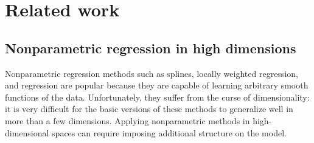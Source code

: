 







\section{Related work}
\label{sec:related-work}



\subsection{Nonparametric regression in high dimensions}
Nonparametric regression methods such as splines, locally weighted regression, and \gp{} regression are popular because they are capable of learning arbitrary smooth functions of the data.
Unfortunately, they suffer from the curse of dimensionality: it is very difficult for the basic versions of these methods to generalize well in more than a few dimensions.
Applying nonparametric methods in high-dimensional spaces can require imposing additional structure on the model.

